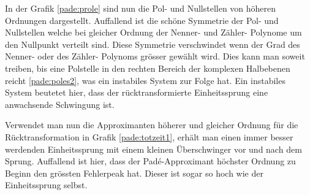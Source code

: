 In der Grafik \ref{pade:prole} sind nun die Pol- und Nullstellen von höheren Ordnungen dargestellt. 
Auffallend ist die schöne Symmetrie der Pol- und Nullstellen welche bei gleicher Ordnung der Nenner- und Zähler- Polynome um den Nullpunkt verteilt sind.
Diese Symmetrie verschwindet wenn der Grad des Nenner- oder des Zähler- Polynoms grösser gewählt wird.
Dies kann man soweit treiben, bis eine Polstelle in den rechten Bereich der komplexen Halbebenen reicht \ref{pade:poles2},
was ein instabiles System zur Folge hat.
Ein instabiles System beutetet hier, dass der rücktransformierte Einheitssprung eine anwachsende Schwingung ist.
 
\begin{figure}
	\centering
\end{figure}
Verwendet man nun die Approximanten höherer und gleicher Ordnung für die Rücktransformation in Grafik \ref{pade:totzeit1}, erhält man einen immer besser werdenden Einheitssprung mit einem kleinen Überschwinger vor und nach dem Sprung. 
Auffallend ist hier, dass der Padé-Approximant höchster Ordnung zu Beginn den grössten Fehlerpeak hat.
Dieser ist sogar so hoch wie der Einheitssprung selbst.

